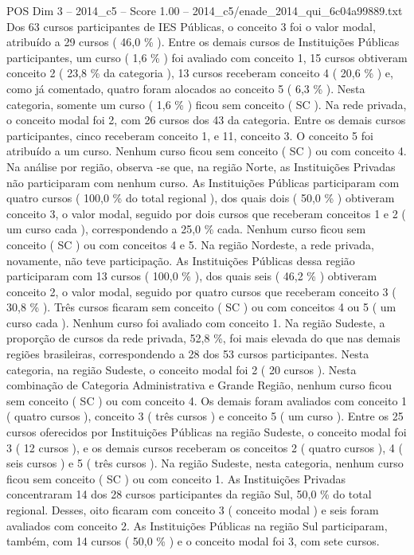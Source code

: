 \begin{textsample}{POS Dim 3 – 2014\_c5 – Score 1.00 – 2014\_c5/enade\_2014\_qui\_6c04a99889.txt}
Dos 63 cursos participantes de IES Públicas, o conceito 3 foi o valor modal, atribuído a 29 cursos ( 46,0 \% ).
Entre os demais cursos de Instituições Públicas participantes, um curso ( 1,6 \% ) foi avaliado com conceito 1, 15 cursos obtiveram conceito 2 ( 23,8 \% da categoria ), 13 cursos receberam conceito 4 ( 20,6 \% ) e, como já comentado, quatro foram alocados ao conceito 5 ( 6,3 \% ).
Nesta categoria, somente um curso ( 1,6 \% ) ficou sem conceito ( SC ).
Na rede privada, o conceito modal foi 2, com 26 cursos dos 43 da categoria.
Entre os demais cursos participantes, cinco receberam conceito 1, e 11, conceito 3.
O conceito 5 foi atribuído a um curso.
Nenhum curso ficou sem conceito ( SC ) ou com conceito 4.
Na análise por região, observa -se que, na região Norte, as Instituições Privadas não participaram com nenhum curso.
As Instituições Públicas participaram com quatro cursos ( 100,0 \% do total regional ), dos quais dois ( 50,0 \% ) obtiveram conceito 3, o valor modal, seguido por dois cursos que receberam conceitos 1 e 2 ( um curso cada ), correspondendo a 25,0 \% cada.
Nenhum curso ficou sem conceito ( SC ) ou com conceitos 4 e 5.
Na região Nordeste, a rede privada, novamente, não teve participação.
As Instituições Públicas dessa região participaram com 13 cursos ( 100,0 \% ), dos quais seis ( 46,2 \% ) obtiveram conceito 2, o valor modal, seguido por quatro cursos que receberam conceito 3 ( 30,8 \% ).
Três cursos ficaram sem conceito ( SC ) ou com conceitos 4 ou 5 ( um curso cada ).
Nenhum curso foi avaliado com conceito 1.
Na região Sudeste, a proporção de cursos da rede privada, 52,8 \%, foi mais elevada do que nas demais regiões brasileiras, correspondendo a 28 dos 53 cursos participantes.
Nesta categoria, na região Sudeste, o conceito modal foi 2 ( 20 cursos ).
Nesta combinação de Categoria Administrativa e Grande Região, nenhum curso ficou sem conceito ( SC ) ou com conceito 4.
Os demais foram avaliados com conceito 1 ( quatro cursos ), conceito 3 ( três cursos ) e conceito 5 ( um curso ).
Entre os 25 cursos oferecidos por Instituições Públicas na região Sudeste, o conceito modal foi 3 ( 12 cursos ), e os demais cursos receberam os conceitos 2 ( quatro cursos ), 4 ( seis cursos ) e 5 ( três cursos ).
Na região Sudeste, nesta categoria, nenhum curso ficou sem conceito ( SC ) ou com conceito 1.
As Instituições Privadas concentraram 14 dos 28 cursos participantes da região Sul, 50,0 \% do total regional.
Desses, oito ficaram com conceito 3 ( conceito modal ) e seis foram avaliados com conceito 2.
As Instituições Públicas na região Sul participaram, também, com 14 cursos ( 50,0 \% ) e o conceito modal foi 3, com sete cursos.

\end{textsample}
